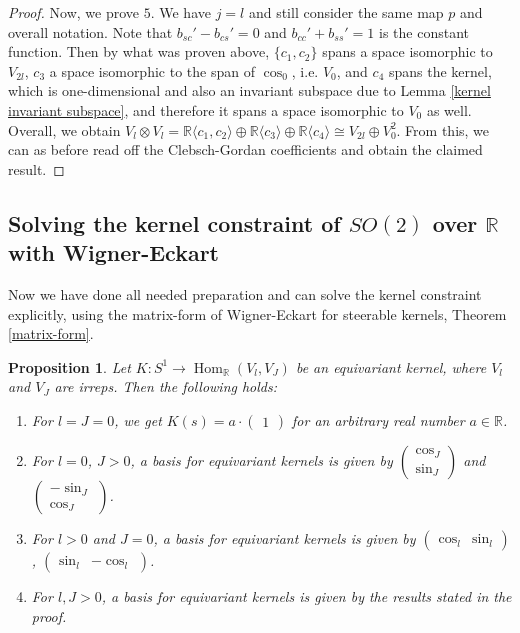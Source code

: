 \documentclass[12pt, a4paper]{article}
\theoremstyle{plain}
\newtheorem{pro}{Proposition}[section]
\theoremstyle{definition}
\theoremstyle{remark}
\newcommand{\R}{\mathds{R}}
\DeclareMathOperator{\Hom}{Hom}
\begin{document}
\begin{proof}
Now, we prove $5$. We have $j = l$ and still consider the same map $p$ and overall notation. Note that $b_{sc}' - b_{cs}' = 0$ and $b_{cc}' + b_{ss}' = 1$ is the constant function. Then by what was proven above, $\{c_1, c_2\}$ spans a space isomorphic to $V_{2l}$, $c_3$ a space isomorphic to the span of $\cos_0$, i.e. $V_0$, and $c_4$ spans the kernel, which is one-dimensional and also an invariant subspace due to Lemma \ref{kernel invariant subspace}, and therefore it spans a space isomorphic to $V_0$ as well. Overall, we obtain $V_l \otimes V_l = \R\langle c_1, c_2\rangle \oplus \R\langle c_3\rangle  \oplus \R\langle c_4\rangle \cong V_{2l} \oplus V_0^2$. From this, we can as before read off the Clebsch-Gordan coefficients and obtain the claimed result.
\end{proof}



\subsection{Solving the kernel constraint of $SO(2)$ over $\R$ with Wigner-Eckart}

Now we have done all needed preparation and can solve the kernel constraint explicitly, using the matrix-form of Wigner-Eckart for steerable kernels, Theorem \ref{matrix-form}.

\begin{pro}
Let $K: S^1 \to \Hom_{\R}(V_l, V_J)$ be an equivariant kernel, where $V_l$ and $V_J$ are irreps. Then the following holds:

\begin{enumerate}
\item For $l = J = 0$, we get $K(s) = a \cdot \begin{pmatrix} 1 \end{pmatrix}$ for an arbitrary real number $a \in \R$.
\item For $l = 0$, $J > 0$, a basis for equivariant kernels is given by $\begin{pmatrix} \cos_J \\ \sin_J \end{pmatrix}$ and $\begin{pmatrix}- \sin_J \\ \cos_J \end{pmatrix}$.
\item For $l > 0$ and $J = 0$, a basis for equivariant kernels is given by $\begin{pmatrix} \cos_l & \sin_l \end{pmatrix}$, $\begin{pmatrix}  \sin_l & - \cos_l \end{pmatrix}$.
\item For $l, J > 0$, a basis for equivariant kernels is given by the results stated in the proof.
\end{enumerate}
\end{pro}
\end{document}
